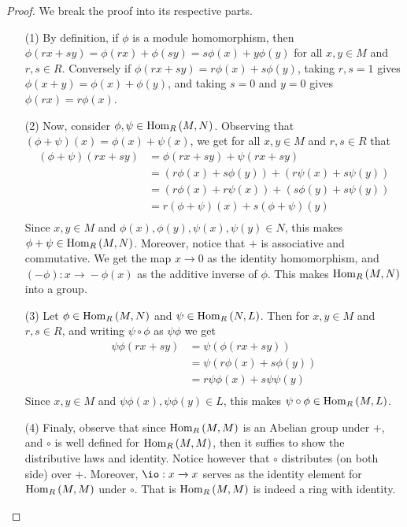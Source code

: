 \begin{proof}
    We break the proof into its respective parts.
    \begin{enumerate}
        \item[(1)] By definition, if $\phi$ is a module homomorphism, then
            $\phi(rx+sy)=\phi(rx)+\phi(sy)=s\phi(x)+y\phi(y)$ for all $x,y \in
            M$ and  $r,s \in R$. Conversely if  $\phi(rx+sy)=r\phi(x)+s\phi(y)$,
            taking $r,s=1$ gives  $\phi(x+y)=\phi(x)+\phi(y)$, and taking $s=0$
            and $y=0$ gives $\phi(rx)=r\phi(x)$.

        \item[(2)] Now, consider $\phi,\psi \in \operatorname{Hom}_R{(M,N)}$. Observing that
            $(\phi+\psi)(x)=\phi(x)+\psi(x)$, we get for all $x,y \in M$ and
            $r,s \in R$ that
            \begin{align*}
                (\phi+\psi)(rx+sy) &=   \phi(rx+sy)+\psi(rx+sy)    \\
                             &=  (r\phi(x)+s\phi(y))+(r\psi(x)+s\psi(y))    \\
                             &= (r\phi(x)+r\psi(x))+(s\phi(y)+s\psi(y)) \\
                             &= r(\phi+\psi)(x)+s(\phi+\psi)(y) \\
            \end{align*}
            Since $x,y \in M$ and  $\phi(x),\phi(y),\psi(x),\psi(y) \in N$, this
            makes $\phi+\psi \in \operatorname{Hom}_R{(M,N)}$. Moreover, notice that $+$ is
            associative and commutative. We get the map $x \xrightarrow{} 0$ as
            the identity homomorphism, and $(-\phi):x \xrightarrow{} -\phi(x)$
            as the additive inverse of $\phi$. This makes  $\operatorname{Hom}_R{(M,N)}$ into
            a group.

        \item[(3)] Let $\phi \in \operatorname{Hom}_R{(M,N)}$ and $\psi \in \operatorname{Hom}_R{(N,L)}$.
            Then for $x,y \in M$ and  $r,s \in R$, and writing $\psi
            \circ \phi$ as  $\psi\phi$ we get
            \begin{align*}
                \psi\phi(rx+sy) &=  \psi(\phi(rx+sy))   \\
                          &=    \psi(r\phi(x)+s\phi(y)) \\
                          &= r\psi\phi(x)+s\psi\psi(y)  \\
            \end{align*}
            Since $x,y \in M$ and  $\psi\phi(x), \psi\phi(y) \in L$, this makes
            $\psi \circ \phi \in \operatorname{Hom}_R{(M,L)}$.

        \item[(4)] Finaly, observe that since $\operatorname{Hom}_R{(M,M)}$ is an Abelian
            group under $+$, and  $\circ$ is well defined for  $\operatorname{Hom}_R{(M,M)}$,
            then it suffies to show the distributive laws and identity. Notice
            however that $\circ$ distributes (on both side) over $+$. Moreover,
             $\io:x \xrightarrow{} x$ serves as the identity element for
             $\operatorname{Hom}_R{(M,M)}$ under $\circ$. That is $\operatorname{Hom}_R{(M,M)}$ is indeed a
             ring with identity.
    \end{enumerate}
\end{proof}
